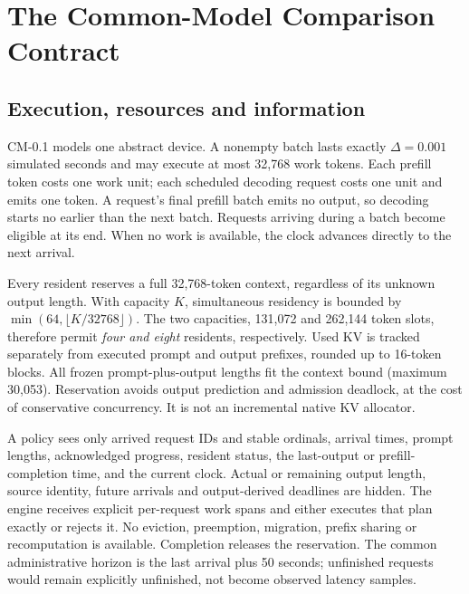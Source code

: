 \section{The Common-Model Comparison Contract}\label{sec:model}
\subsection{Execution, resources and information}
CM-0.1 models one abstract device. A nonempty batch lasts exactly
$\Delta=0.001$ simulated seconds and may execute at most 32,768 work
tokens. Each prefill token costs one work unit; each scheduled decoding
request costs one unit and emits one token. A request's final prefill
batch emits no output, so decoding starts no earlier than the next batch.
Requests arriving during a batch become eligible at its end. When no work
is available, the clock advances directly to the next arrival.

Every resident reserves a full 32,768-token context, regardless of its
unknown output length. With capacity $K$, simultaneous residency is
bounded by $\min(64,\lfloor K/32768\rfloor)$. The two capacities,
131,072 and 262,144 token slots, therefore permit \emph{four and eight}
residents, respectively. Used KV is tracked separately from executed
prompt and output prefixes, rounded up to 16-token blocks. All frozen
prompt-plus-output lengths fit the context bound (maximum 30,053).
Reservation avoids output prediction and admission deadlock, at the cost
of conservative concurrency. It is not an incremental native KV allocator.

A policy sees only arrived request IDs and stable ordinals, arrival times,
prompt lengths, acknowledged progress, resident status, the last-output
or prefill-completion time, and the current clock. Actual or remaining
output length, source identity, future arrivals and output-derived
deadlines are hidden. The engine receives explicit per-request work spans
and either executes that plan exactly or rejects it. No eviction,
preemption, migration, prefix sharing or recomputation is available.
Completion releases the reservation. The common administrative horizon
is the last arrival plus 50 seconds; unfinished requests would remain
explicitly unfinished, not become observed latency samples.

